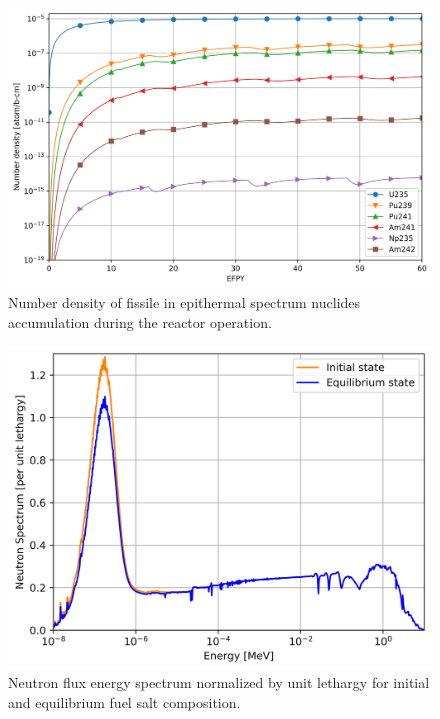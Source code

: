 \documentclass[review]{elsarticle}
\begin{document}
\begin{figure}[htbp!]
    \begin{center}
		\includegraphics[width=\textwidth]{fissile_short.png}
    \end{center}
	\caption{Number density of fissile in epithermal spectrum nuclides accumulation during the reactor operation.}
	\label{fig:fissile_short}
\end{figure}
\begin{figure}[htbp!]
    \begin{center}
		\includegraphics[width=\textwidth]{spectrum.png} 
    \end{center}
	\caption{Neutron flux energy spectrum normalized by unit lethargy for initial and equilibrium fuel salt composition.}
	\label{fig:spectrum}
\end{figure}
\end{document}
